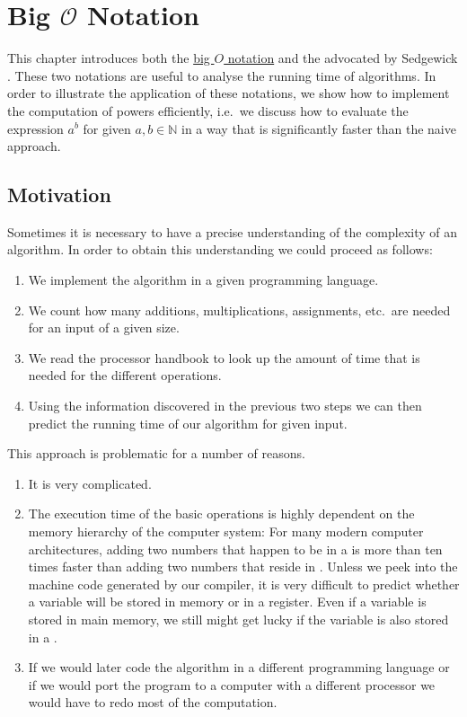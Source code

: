 \chapter{Big $\mathcal{O}$ Notation} 
This chapter introduces both the
\href{http://en.wikipedia.org/wiki/O_notation}{big $O$ notation} and the
 advocated by Sedgewick \cite{sedgewick:11}.
These two notations are useful to analyse the running time of algorithms.  In order to illustrate
the application of these notations, we show how to implement the computation of powers efficiently,
i.e.~we discuss how to evaluate the expression $a^b$ for given $a,b \in \mathbb{N}$ in a way that
is significantly faster than the naive approach. 
\section{Motivation}
Sometimes it is necessary to have a precise understanding of the complexity of an algorithm.  
In order to obtain this understanding we could proceed as follows:  
\begin{enumerate}
\item We implement the algorithm in a given programming language.
\item We count how many additions, multiplications, assignments, etc.~are needed
      for an input of a given size.
\item We read the processor handbook to look up the amount of time that is needed for the different operations.
\item Using the information discovered in the previous two steps we can then predict the running
      time of our algorithm for given input.
\end{enumerate}
This approach is problematic for a number of reasons.
\begin{enumerate}
\item It is very complicated.
\item The execution time of the basic operations is highly dependent on the memory hierarchy of the
      computer system:  For many modern computer architectures, adding two numbers that happen to be
      in a  is more than ten times faster than adding two numbers that reside in
      .  Unless we peek into the machine code generated by our compiler, it is very difficult
      to predict whether a variable will be stored in memory or in a register.  Even if a variable
      is stored in main memory, we still might get lucky if the variable is also stored in a .
\item If we would later code the algorithm in a different programming language or if we would port
      the program to a computer with a different processor we would have to redo most of the
      computation. 
\end{enumerate}
